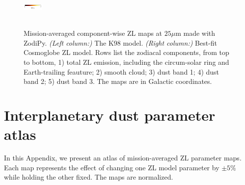 \documentclass[twocolumn]{aa}
\begin{document}
\begin{figure}[hbt]
{    \includegraphics[width=1cm,angle=90]{figs/comp_maps/cbar_2.pdf}%
    }\\
    \\
    \caption{Mission-averaged component-wise ZL maps at $25\mu$m made with ZodiPy. 
    \textit{(Left column:)} The K98 model. \textit{(Right column:)} Best-fit Cosmoglobe ZL model.
    Rows list the zodiacal components, from top to bottom, 1) total ZL emission, including the 
    circum-solar ring and Earth-trailing feauture; 2) smooth cloud; 3) dust band 1; 4) 
    dust band 2; 5) dust band 3. The maps are in Galactic coordinates.}
    \label{fig:mission-averaged-comp-maps}
\end{figure}

\clearpage
\section{Interplanetary dust parameter atlas}
\label{sec:param-atlas}
In this Appendix, we present an atlas of mission-averaged ZL parameter maps.
Each map represents the effect of changing one ZL model parameter by $\pm 5\%$ while holding the other fixed. The maps are normalized.
\end{document}
